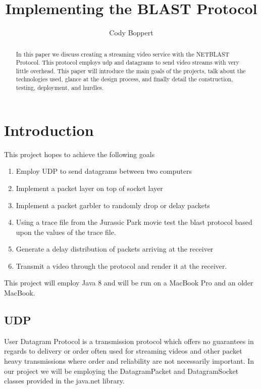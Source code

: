 \documentclass[twocolumn,nofootinbib,%
notitlepage,11pt]{report}
\begin{document}
\title{Implementing the BLAST Protocol}
\author{Cody Boppert}

\maketitle

\begin{abstract}
In this paper we discuss creating a streaming video service with the NETBLAST Protocol. This protocol employs udp and datagrams to send video streams with very little overhead. This paper will introduce the main goals of the projects, talk about the technologies used, glance at the design process, and finally detail the construction, testing, deployment, and hurdles.
\end{abstract}

\section*{Introduction}
This project hopes to achieve the following goals 

\begin{enumerate}
\item Employ UDP to send datagrams between two computers
\item Implement a packet layer on top of socket layer
\item Implement a packet garbler to randomly drop or delay packets
\item Using a trace file from the Jurassic Park movie test the blast protocol based upon the values of the trace file.
\item Generate a delay distribution of packets arriving at the receiver
\item Transmit a video through the protocol and render it at the receiver.
\end{enumerate}

This project will employ Java 8 and will be run on a MacBook Pro\cite{mbp} and an older MacBook\cite{mb}.

\subsection*{UDP}
User Datagram Protocol is a transmission protocol which offers no guarantees in regards to delivery or order often used for streaming videos and other packet heavy transmissions where order and reliability are not necessarily important.\cite{udp} In our project we will be employing the DatagramPacket and DatagramSocket classes provided in the java.net library. 
\end{document}
